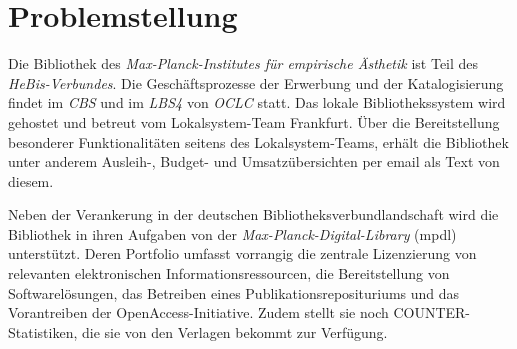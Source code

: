 \documentclass[10pt,a4paper,twocolumn,conference]{IEEEtran}
\begin{document}
\begin{comment}
\end{comment}


\section{Problemstellung}
Die Bibliothek des \textit{Max-Planck-Institutes für empirische Ästhetik}
ist Teil des \textit{HeBis-Verbundes}. Die Geschäftsprozesse der Erwerbung und
der Katalogisierung findet im \textit{CBS} und im \textit{LBS4} von
\textit{OCLC} statt. Das  
lokale Bibliothekssystem wird gehostet und betreut vom Lokalsystem-Team Frankfurt.
Über die Bereitstellung besonderer Funktionalitäten seitens des
Lokalsystem-Teams, erhält die Bibliothek unter anderem Ausleih-, Budget- und
Umsatzübersichten per email als Text von diesem. 


Neben der Verankerung in der deutschen Bibliotheksverbundlandschaft
wird die Bibliothek in ihren Aufgaben von der
\textit{Max-Planck-Digital-Library} (mpdl)
unterstützt. Deren Portfolio umfasst vorrangig die zentrale Lizenzierung
von relevanten elektronischen Informationsressourcen, die Bereitstellung
von Softwarelösungen, das Betreiben eines Publikationsreposituriums und 
das Vorantreiben der OpenAccess-Initiative. Zudem stellt sie noch
COUNTER-Statistiken, die sie von den Verlagen bekommt zur Verfügung.
\end{document}
